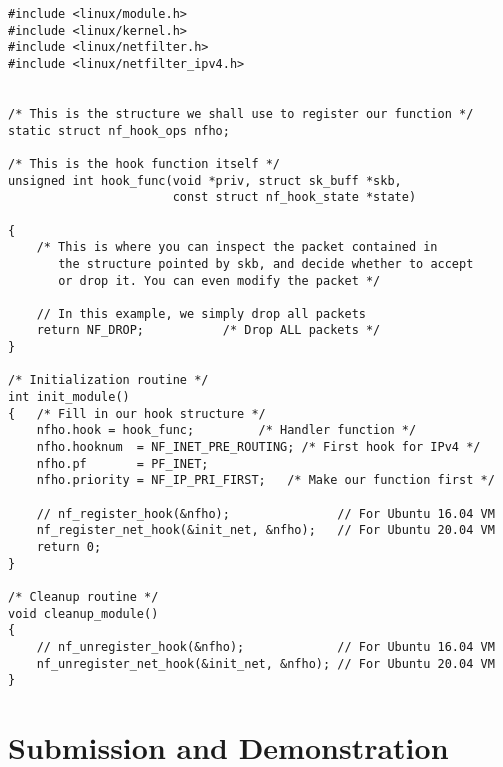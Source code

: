 \begin{lstlisting}
#include <linux/module.h>
#include <linux/kernel.h>
#include <linux/netfilter.h>
#include <linux/netfilter_ipv4.h>


/* This is the structure we shall use to register our function */
static struct nf_hook_ops nfho;

/* This is the hook function itself */
unsigned int hook_func(void *priv, struct sk_buff *skb, 
                       const struct nf_hook_state *state)

{
    /* This is where you can inspect the packet contained in
       the structure pointed by skb, and decide whether to accept 
       or drop it. You can even modify the packet */

    // In this example, we simply drop all packets
    return NF_DROP;           /* Drop ALL packets */
}

/* Initialization routine */
int init_module()
{   /* Fill in our hook structure */
    nfho.hook = hook_func;         /* Handler function */
    nfho.hooknum  = NF_INET_PRE_ROUTING; /* First hook for IPv4 */
    nfho.pf       = PF_INET;
    nfho.priority = NF_IP_PRI_FIRST;   /* Make our function first */

    // nf_register_hook(&nfho);               // For Ubuntu 16.04 VM
    nf_register_net_hook(&init_net, &nfho);   // For Ubuntu 20.04 VM
    return 0;
}

/* Cleanup routine */
void cleanup_module()
{
    // nf_unregister_hook(&nfho);             // For Ubuntu 16.04 VM
    nf_unregister_net_hook(&init_net, &nfho); // For Ubuntu 20.04 VM
}
\end{lstlisting}




\section{Submission and Demonstration}


\seedsubmission







